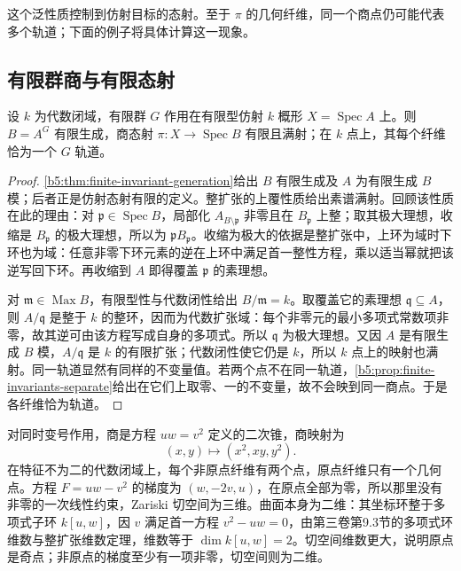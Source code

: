 这个泛性质控制到仿射目标的态射。至于 \(\pi\) 的几何纤维，同一个商点仍可能代表多个轨道；下面的例子将具体计算这一现象。

\subsection{有限群商与有限态射}
\label{b5:subsec:2206:02}

\begin{theorem}\label{b5:thm:finite-group-quotient}
	设 \(k\) 为代数闭域，有限群 \(G\) 作用在有限型仿射 \(k\) 概形 \(X=\operatorname{Spec}A\) 上。则 \(B=A^G\) 有限生成，商态射 \(\pi:X\to\operatorname{Spec}B\) 有限且满射；在 \(k\) 点上，其每个纤维恰为一个 \(G\) 轨道。
\end{theorem}
\begin{proof}
	\cref{b5:thm:finite-invariant-generation}给出 \(B\) 有限生成及 \(A\) 为有限生成 \(B\) 模；后者正是仿射态射有限的定义。整扩张的上覆性质给出素谱满射。回顾该性质在此的理由：对 \(\mathfrak p\in\operatorname{Spec}B\)，局部化 \(A_{B\setminus\mathfrak p}\) 非零且在 \(B_{\mathfrak p}\) 上整；取其极大理想，收缩是 \(B_{\mathfrak p}\) 的极大理想，所以为 \(\mathfrak pB_{\mathfrak p}\)。收缩为极大的依据是整扩张中，上环为域时下环也为域：任意非零下环元素的逆在上环中满足首一整性方程，乘以适当幂就把该逆写回下环。再收缩到 \(A\) 即得覆盖 \(\mathfrak p\) 的素理想。

	对 \(\mathfrak m\in\operatorname{Max}B\)，有限型性与代数闭性给出 \(B/\mathfrak m=k\)。取覆盖它的素理想 \(\mathfrak q\subseteq A\)，则 \(A/\mathfrak q\) 是整于 \(k\) 的整环，因而为代数扩张域：每个非零元的最小多项式常数项非零，故其逆可由该方程写成自身的多项式。所以 \(\mathfrak q\) 为极大理想。又因 \(A\) 是有限生成 \(B\) 模，\(A/\mathfrak q\) 是 \(k\) 的有限扩张；代数闭性使它仍是 \(k\)，所以 \(k\) 点上的映射也满射。同一轨道显然有同样的不变量值。若两个点不在同一轨道，\cref{b5:prop:finite-invariants-separate}给出在它们上取零、一的不变量，故不会映到同一商点。于是各纤维恰为轨道。
\end{proof}

对同时变号作用，商是方程 \(uw=v^2\) 定义的二次锥，商映射为
\[
	(x,y)\longmapsto(x^2,xy,y^2).
\]
在特征不为二的代数闭域上，每个非原点纤维有两个点，原点纤维只有一个几何点。方程 \(F=uw-v^2\) 的梯度为 \((w,-2v,u)\)，在原点全部为零，所以那里没有非零的一次线性约束，Zariski 切空间为三维。曲面本身为二维：其坐标环整于多项式子环 \(k[u,w]\)，因 \(v\) 满足首一方程 \(v^2-uw=0\)，由第三卷第9.3节的多项式环维数与整扩张维数定理，维数等于 \(\dim k[u,w]=2\)。切空间维数更大，说明原点是奇点；非原点的梯度至少有一项非零，切空间则为二维。

